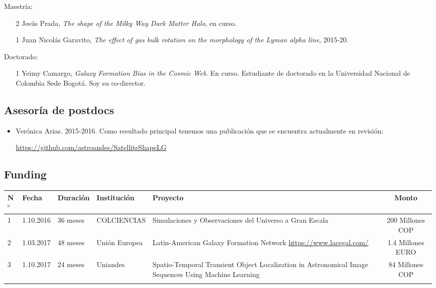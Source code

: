 \documentclass{article}
\begin{document}
Maestr\'ia:
\begin{itemize}
\item [2] Jes\'us Prada, \emph{The shape of the Milky Way Dark Matter
  Halo}, en curso.
\item [1] Juan Nicol\'as Garavito, \emph{The effect of gas bulk rotation
  on the morphology of the Lyman alpha line}, 2015-20.
\end{itemize}

Doctorado:
\begin{itemize}
\item [1] Yeimy Camargo, \emph{Galaxy Formation Bias in the Cosmic
  Web}. En curso. Estudiante de doctorado en la Universidad Nacional de Colombia
  Sede Bogot\'a. Soy su co-director.
\end{itemize}

\subsection{Asesor\'ia de postdocs}

\begin{itemize}
\item Ver\'onica Arias. 2015-2016. Como resultado principal tenemos
  una publicaci\'on que se encuentra actualmente en revisi\'on:

\url{https://github.com/astroandes/SatelliteShapeLG}

\end{itemize}

\subsection{Funding}
\begin{tabular}{l l l p{2.4cm} p{4.0cm} c}\hline
N$^{o}$ & Fecha & Duraci\'on & Instituci\'on & Proyecto & Monto \\\hline
1 & 1.10.2016 & 36 meses & COLCIENCIAS & Simulaciones y Observaciones del Universo a Gran Escala & 200 Millones COP\\\hline
2 & 1.03.2017 & 48 meses & Uni\'on Europea & Latin-American Galaxy Formation Network \url{https://www.lacegal.com/} & 1.4 Millones EURO \\\hline
3 & 1.10.2017 & 24 meses & Uniandes & 
Spatio-Temporal Transient Object Localization in Astronomical Image
Sequences Using Machine Learning & 84 Millones COP \\
\\\hline 
\end{tabular}
\end{document}

